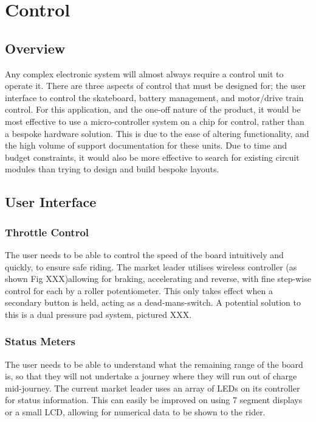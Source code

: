 \documentclass[journal,10pt]{IEEEtran}
\begin{document}
\section{Control}
    \subsection{Overview}
    	Any complex electronic system will almost always require a control unit to operate it.
    	There are three aspects of control that must be designed for; the user interface to control the skateboard, battery management, and motor/drive train control.
    	For this application, and the one-off nature of the product, it would be most effective to use a micro-controller system on a chip for control, rather than a bespoke hardware solution.
    	This is due to the ease of altering functionality, and the high volume of support documentation for these units.
    	Due to time and budget constraints, it would also be more effective to search for existing circuit modules than trying to design and build bespoke layouts.
    \subsection{User Interface}
    	\subsubsection{Throttle Control}
    		The user needs to be able to control the speed of the board intuitively and quickly, to ensure safe riding.
    		The market leader utilises wireless controller (as shown Fig XXX)allowing for braking, accelerating and reverse, with fine step-wise control for each by a roller potentiometer.
    		This only takes effect when a secondary button is held, acting as a dead-mans-switch.
    		A potential solution to this is a dual pressure pad system, pictured XXX.
    	\subsubsection{Status Meters}
    		The user needs to be able to understand what the remaining range of the board is, so that they will not undertake a journey where they will run out of charge mid-journey.
    	The current market leader uses an array of LEDs on its controller for status information.
    		This can easily be improved on using 7 segment displays or a small LCD, allowing for numerical data to be shown to the rider.
\end{document}

